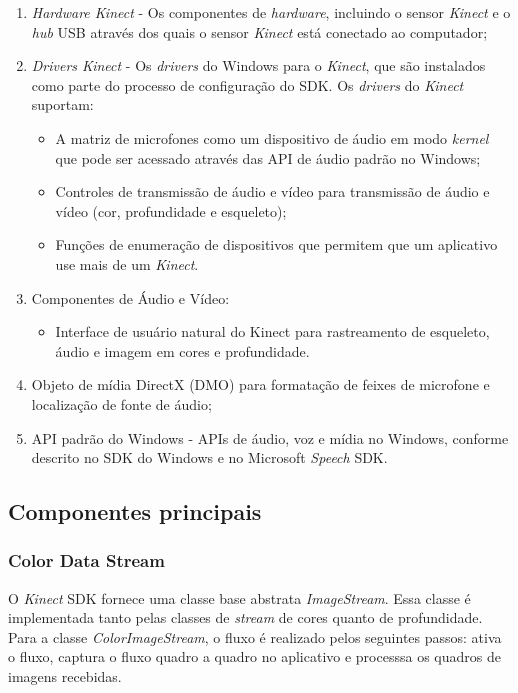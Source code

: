 \begin{enumerate}
    \item \textit{Hardware Kinect} - Os componentes de \textit{hardware}, incluindo o sensor \textit{Kinect} e o \textit{hub} USB através dos quais o sensor \textit{Kinect} está conectado ao computador;
    \item \textit{Drivers Kinect} - Os \textit{drivers} do Windows para o \textit{Kinect}, que são instalados como parte do processo de configuração do SDK. Os \textit{drivers} do \textit{Kinect} suportam:
        \begin{itemize}
            \item A matriz de microfones como um dispositivo de áudio em modo \textit{kernel} que pode ser acessado  através das API de áudio padrão no Windows; 
            \item Controles de transmissão de áudio e vídeo para transmissão de áudio e vídeo (cor, profundidade e esqueleto);
            \item Funções de enumeração de dispositivos que permitem que um aplicativo use mais de um \textit{Kinect}.	
        \end{itemize} 
    \item Componentes de Áudio e Vídeo:
        \begin{itemize}
            \item Interface de usuário natural do Kinect para rastreamento de esqueleto, áudio e imagem em cores e profundidade. 
        \end{itemize}
    \item Objeto de mídia DirectX (DMO) para formatação de feixes de microfone e localização de fonte de áudio;
    \item API padrão do Windows - APIs de áudio, voz e mídia no Windows, conforme descrito no SDK do Windows e no Microsoft \textit{Speech} SDK.
\end{enumerate}


\subsection{Componentes principais}\label{sec:componentes}

\subsubsection{Color Data Stream}\label{sec:colorDataStream}
O \textit{Kinect} SDK fornece uma classe base abstrata \textit{ImageStream}. Essa classe é implementada tanto pelas classes de \textit{stream} de cores quanto de profundidade. Para a classe \textit{ColorImageStream}, o fluxo é realizado pelos seguintes passos: ativa o fluxo, captura o fluxo quadro a quadro no aplicativo e processsa os quadros de imagens recebidas.

